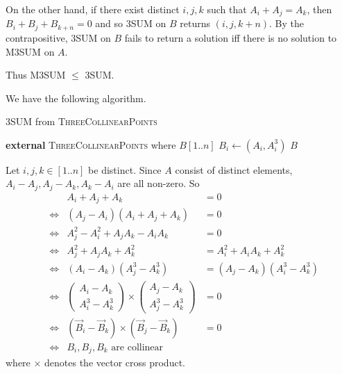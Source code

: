 \documentclass[12pt]{article}
\begin{document}
\begin{solution}
    On the other hand, if there exist distinct $i, j, k$ such that
    $A_{i} + A_{j} = A_{k}$, then $B_{i} + B_{j} + B_{k + n} = 0$ and so
    \textsc{3SUM} on $B$ returns $(i, j, k + n)$.
    By the contrapositive, \textsc{3SUM} on $B$ fails to return a solution iff
    there is no solution to \textsc{M3SUM} on $A$.

    Thus \textsc{M3SUM} $\leq$ \textsc{3SUM}.
\end{solution}

\begin{problem} \label{prb:3collinear}
\end{problem}
\begin{solution}
    We have the following algorithm.
    \begin{algorithm}
        \caption{\textsc{3SUM} from \textsc{ThreeCollinearPoints}} \label{alg:3collinear}
        \begin{algorithmic}[1]
            \State \textbf{external} \textsc{ThreeCollinearPoints}
                \State \Return {}
            \EndFunction
            \Statex where
                \State $B[1..n]$
                    \State $B_{i} \gets (A_{i}, A_{i}^3)$
                \EndFor
                \State \Return $B$
            \EndFunction
        \end{algorithmic}
    \end{algorithm}
    Let $i, j, k \in [1..n]$ be distinct.
    Since $A$ consist of distinct elements,
    $A_{i} - A_{j}, A_{j} - A_{k}, A_{k} - A_{i}$ are all non-zero.
    So
    \begin{align*}
        && A_{i} + A_{j} + A_{k} &= 0 \\
        &\iff& (A_{j} - A_{i}) (A_{i} + A_{j} + A_{k}) &= 0 \\
        &\iff& A_{j}^{2} - A_{i}^{2} + A_{j} A_{k} - A_{i} A_{k} &= 0 \\
        &\iff& A_{j}^{2} + A_{j} A_{k} + A_{k}^{2} &= A_{i}^{2} + A_{i} A_{k} + A_{k}^{2} \\
        &\iff& (A_{i} - A_{k}) (A_{j}^{3} - A_{k}^{3}) &= (A_{j} - A_{k}) (A_{i}^{3} - A_{k}^{3}) \\
        &\iff& \begin{pmatrix}
            A_{i} - A_{k} \\
            A_{i}^3 - A_{k}^3
        \end{pmatrix} \times \begin{pmatrix}
            A_{j} - A_{k} \\
            A_{j}^3 - A_{k}^3
        \end{pmatrix} &= 0 \\
        &\iff& (\vec{B}_{i} - \vec{B}_{k}) \times (\vec{B}_{j} - \vec{B}_{k}) &= 0 \\
        &\iff& B_{i}, B_{j}, B_{k} \text{ are collinear}
    \end{align*}
    where $\times$ denotes the vector cross product.


\end{solution}
\end{document}

